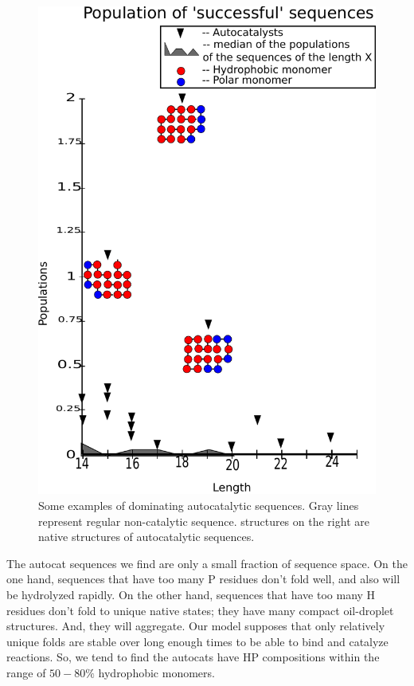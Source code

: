 \documentclass[journal=jacsat,manuscript=article,layout=twocolumn]{achemso}
\begin{document}
\begin{figure}[h!]
  \centering
  \includegraphics[width=\columnwidth]{pictures/good_seqs.pdf} 
  \caption{Some examples of dominating autocatalytic sequences. Gray lines represent regular 
non-catalytic sequence. structures on the right are native structures of autocatalytic sequences. }
  \label{fig:example1}
\end{figure}



 The autocat sequences we find are only a small fraction of sequence space.  On the one hand, 
sequences that have too many P residues don't fold well, and also will be hydrolyzed rapidly.  On 
the other hand, sequences that have too many H residues don't fold to unique native states; they 
have many compact oil-droplet structures.  And, they will aggregate.  Our model supposes that only 
relatively unique folds are stable over long enough times to be able to bind and catalyze reactions. 
 So, we tend to find the autocats have HP compositions within the range of $50-80\%$ hydrophobic 
monomers.
 
\end{document}
